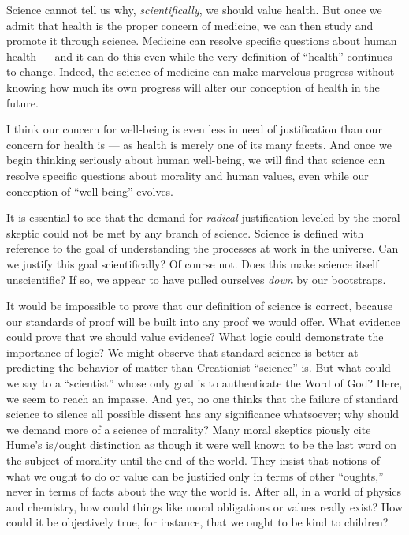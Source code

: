 \documentclass[a4paper,14pt]{extbook}
\begin{document}
Science cannot tell us why, \textit{scientifically}, we should value health.
But once we admit that health is the proper concern of medicine, we can then study and promote it through science.
Medicine can resolve specific questions about human health --- and it can do this even while the very definition of ``health'' continues to change.
Indeed, the science of medicine can make marvelous progress without knowing how much its own progress will alter our conception of health in the future.

I think our concern for well-being is even less in need of justification than our concern for health is --- as health is merely one of its many facets.
And once we begin thinking seriously about human well-being, we will find that science can resolve specific questions about morality and human values, even while our conception of ``well-being'' evolves.

It is essential to see that the demand for \textit{radical} justification leveled by the moral skeptic could not be met by any branch of science.
Science is defined with reference to the goal of understanding the processes at work in the universe.
Can we justify this goal scientifically?
Of course not.
Does this make science itself unscientific?
If so, we appear to have pulled ourselves \textit{down} by our bootstraps.

It would be impossible to prove that our definition of science is correct, because our standards of proof will be built into any proof we would offer.
What evidence could prove that we should value evidence?
What logic could demonstrate the importance of logic?
We might observe that standard science is better at predicting the behavior of matter than Creationist ``science'' is.
But what could we say to a ``scientist'' whose only goal is to authenticate the Word of God?
Here, we seem to reach an impasse.
And yet, no one thinks that the failure of standard science to silence all possible dissent has any significance whatsoever;
why should we demand more of a science of morality?
Many moral skeptics piously cite Hume's is/ought distinction as though it were well known to be the last word on the subject of morality until the end of the world.
They insist that notions of what we ought to do or value can be justified only in terms of other ``oughts,'' never in terms of facts about the way the world is.
After all, in a world of physics and chemistry, how could things like moral obligations or values really exist?
How could it be objectively true, for instance, that we ought to be kind to children?
\end{document}
